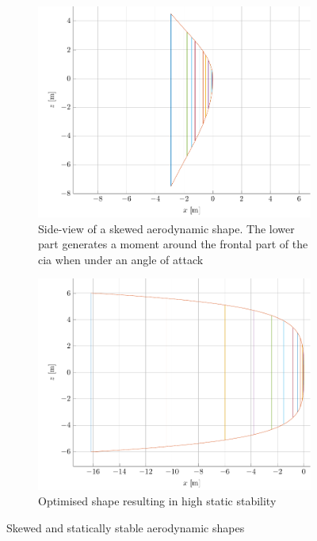 \begin{figure}[h]
	\begin{subfigure}[t]{0.45\textwidth}
		\centering
		\includegraphics[width=1\textwidth]{./Figure/Aerodynamics/sideview_skewness.pdf}
		\captionsetup{width=0.9\textwidth,skip=-8pt}
		\caption[Side-view of a skewed aerodynamic shape]{Side-view of a skewed aerodynamic shape. The lower part generates a moment around the frontal part of the \gls{cia} when under an angle of attack}
		\label{fig:skewnessplot}
	\end{subfigure}
	\begin{subfigure}[t]{0.45\textwidth}
		\centering
		\captionsetup{width=0.9\textwidth}		
		\includegraphics[width=1\textwidth]{./Figure/Aerodynamics/sideview_cmalpha.pdf}
		\caption{Optimised shape resulting in high static stability}
		\label{fig:highcmalphashape}
	\end{subfigure}	
	\caption{Skewed and statically stable aerodynamic shapes}
\end{figure}
	

